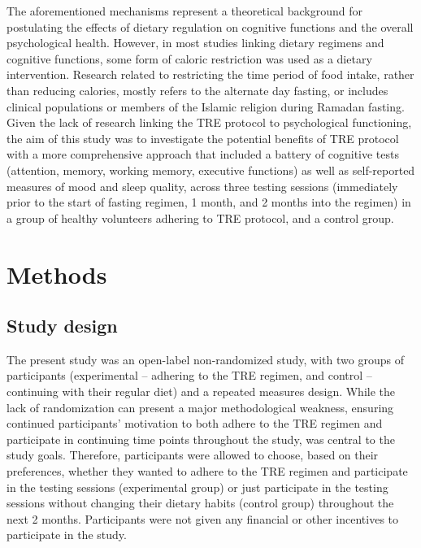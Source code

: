\documentclass[authordate, empirical]{jote-new-article}
\begin{document}
The aforementioned mechanisms represent a theoretical background for postulating the effects of dietary regulation on cognitive functions and the overall psychological health. However, in most studies linking dietary regimens and cognitive functions, some form of caloric restriction was used as a dietary intervention. Research related to restricting the time period of food intake, rather than reducing calories, mostly refers to the alternate day fasting, or includes clinical populations or members of the Islamic religion during Ramadan fasting. Given the lack of research linking the TRE protocol to psychological functioning, the aim of this study was to investigate the potential benefits of TRE protocol with a more comprehensive approach that included a battery of cognitive tests (attention, memory, working memory, executive functions) as well as self-reported measures of mood and sleep quality, across three testing sessions (immediately prior to the start of fasting regimen, 1 month, and 2 months into the regimen) in a group of healthy volunteers adhering to TRE protocol, and a control group.



\section{Methods}



\subsection{Study design}



The present study was an open-label non-randomized study, with two groups of participants (experimental -- adhering to the TRE regimen, and control -- continuing with their regular diet) and a repeated measures design.\textbf{ }While the lack of randomization can present a major methodological weakness, ensuring continued participants' motivation to both adhere to the TRE regimen and participate in continuing time points throughout the study, was central to the study goals. Therefore, participants were allowed to choose, based on their preferences, whether they wanted to adhere to the TRE regimen and participate in the testing sessions (experimental group) or just participate in the testing sessions without changing their dietary habits (control group) throughout the next 2 months. Participants were not given any financial or other incentives to participate in the study.
\end{document}
